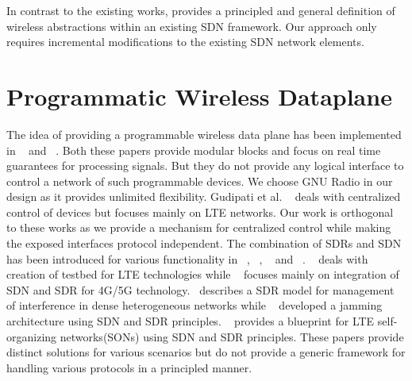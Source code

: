 In contrast to the existing works, \aetherflow  provides a principled and general definition of wireless abstractions within an existing SDN framework. Our approach only requires incremental modifications to the existing SDN network elements.

\section{Programmatic Wireless Dataplane} 

The idea of providing a programmable wireless data plane has been implemented in ~\cite{openraio} and ~\cite{atomix}. Both these papers provide modular blocks and focus on real time guarantees for processing signals. But they do not provide any logical interface to control a network of such programmable devices. We choose GNU Radio in our design as it provides unlimited flexibility. Gudipati et al. ~\cite{softran} deals with centralized control of devices but focuses mainly on LTE networks. Our work is orthogonal to these works as we provide a mechanism for centralized control while making the exposed interfaces protocol independent.
The combination of SDRs and SDN has been introduced for various functionality in ~\cite{cho2014integration, sun2015integrating}, ~\cite{mancuso2014prototyping}, ~\cite{corbett2014countering} and ~\cite{sdnsdrinsno}. ~\cite{mancuso2014prototyping} deals with creation of testbed for LTE technologies while ~\cite{cho2014integration, sun2015integrating} focuses mainly on integration of SDN and SDR for 4G/5G technology.~\cite{gupta2015labview} describes a SDR model for management of interference in dense heterogeneous networks while ~\cite{corbett2014countering} developed a jamming architecture using SDN and SDR principles. ~\cite{sdnsdrinsno} provides a blueprint for LTE self-organizing networks(SONs) using SDN and SDR principles. These papers provide distinct solutions for various scenarios but do not provide a generic framework for handling various protocols in a principled manner.
